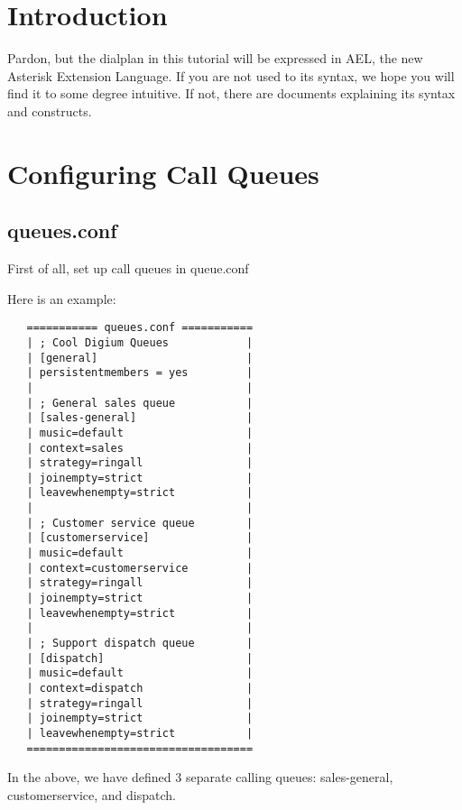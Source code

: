 
\section{Introduction}

Pardon, but the dialplan in this tutorial will be expressed
in AEL, the new Asterisk Extension Language. If you are
not used to its syntax, we hope you will find it to some
degree intuitive. If not, there are documents explaining
its syntax and constructs.


\section{Configuring Call Queues}

\subsection{queues.conf}
First of all, set up call queues in queue.conf

Here is an example:

\begin{astlisting}
\begin{verbatim}
   =========== queues.conf ===========
   | ; Cool Digium Queues            |
   | [general]                       |
   | persistentmembers = yes         |
   |                                 |
   | ; General sales queue           |
   | [sales-general]                 |
   | music=default                   |
   | context=sales                   |
   | strategy=ringall                |
   | joinempty=strict                |
   | leavewhenempty=strict           |
   |                                 |
   | ; Customer service queue        |
   | [customerservice]               |
   | music=default                   |
   | context=customerservice         |
   | strategy=ringall                |
   | joinempty=strict                |
   | leavewhenempty=strict           |
   |                                 |
   | ; Support dispatch queue        |
   | [dispatch]                      |
   | music=default                   |
   | context=dispatch                |
   | strategy=ringall                |
   | joinempty=strict                |
   | leavewhenempty=strict           |
   ===================================
\end{verbatim}
\end{astlisting}

In the above, we have defined 3 separate calling queues:
sales-general, customerservice, and dispatch.

